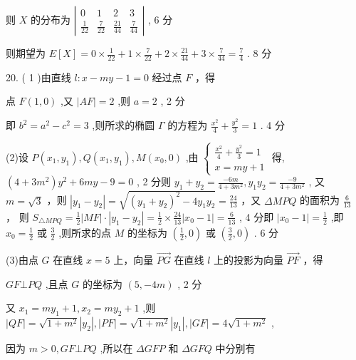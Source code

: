 \documentclass[10pt]{article}
\begin{document}
则 \(X\) 的分布为 \(\left| \begin{matrix} 0 & 1 & 2 & 3 \\  \frac{1}{22} & \frac{7}{22} & \frac{21}{44} & \frac{7}{44} \end{matrix}\right|\) , 6 分

则期望为 \(E\left\lbrack  X\right\rbrack   = 0 \times  \frac{1}{22} + 1 \times  \frac{7}{22} + 2 \times  \frac{21}{44} + 3 \times  \frac{7}{44} = \frac{7}{4}\) . 8 分

20. ( 1 )由直线 \(l : x - {my} - 1 = 0\) 经过点 \(F\) ，得

点 \(F\left( {1,0}\right)\) ,又 \(\left| {AF}\right|  = 2\) ,则 \(a = 2\) , 2 分

即 \({b}^{2} = {a}^{2} - {c}^{2} = 3\) ,则所求的椭圆 \(\Gamma\) 的方程为 \(\frac{{x}^{2}}{4} + \frac{{y}^{2}}{3} = 1\) . 4 分

(2)设 \(P\left( {{x}_{1},{y}_{1}}\right) ,Q\left( {{x}_{1},{y}_{1}}\right) ,M\left( {{x}_{0},0}\right)\) ,由 \(\left\{  \begin{array}{l} \frac{{x}^{2}}{4} + \frac{{y}^{2}}{3} = 1 \\  x = {my} + 1 \end{array}\right.\) 得, \(\left( {4 + 3{m}^{2}}\right) {y}^{2} + {6my} - 9 = 0\) , 2 分则 \({y}_{1} + {y}_{2} = \frac{-{6m}}{4 + 3{m}^{2}},{y}_{1}{y}_{2} = \frac{-9}{4 + 3{m}^{2}}\) , 又 \(m = \sqrt{3}\) ，则 \(\left| {{y}_{1} - {y}_{2}}\right|  = \sqrt{{\left( {y}_{1} + {y}_{2}\right) }^{2} - 4{y}_{1}{y}_{2}} = \frac{24}{13}\) ，又 \({\Delta M}{PQ}\) 的面积为 \(\frac{6}{13}\) ， 则 \({S}_{\bigtriangleup {MPQ}} = \frac{1}{2}\left| {MF}\right|  \cdot  \left| {{y}_{1} - {y}_{2}}\right|  = \frac{1}{2} \times  \frac{24}{13}\left| {{x}_{0} - 1}\right|  = \frac{6}{13}\) , 4 分即 \(\left| {{x}_{0} - 1}\right|  = \frac{1}{2}\) ,即 \({x}_{0} = \frac{1}{2}\) 或 \(\frac{3}{2}\) ,则所求的点 \(M\) 的坐标为 \(\left( {\frac{1}{2},0}\right)\) 或 \(\left( {\frac{3}{2},0}\right)\) . 6 分

(3)由点 \(G\) 在直线 \(x = 5\) 上，向量 \(\overrightarrow{PG}\) 在直线 \(l\) 上的投影为向量 \(\overrightarrow{PF}\) ，得

\({GF} \bot  {PQ}\) ,且点 \(G\) 的坐标为 \(\left( {5, - {4m}}\right)\) , 2 分

又 \({x}_{1} = m{y}_{1} + 1,{x}_{2} = m{y}_{2} + 1\) ,则 \(\left| {QF}\right|  = \sqrt{1 + {m}^{2}}\left| {y}_{2}\right| ,\left| {PF}\right|  = \sqrt{1 + {m}^{2}}\left| {y}_{1}\right| ,\left| {GF}\right|  = 4\sqrt{1 + {m}^{2}}\) ,

因为 \(m > 0,{GF} \bot  {PQ}\) ,所以在 \({\Delta GFP}\) 和 \({\Delta GFQ}\) 中分别有
\end{document}
